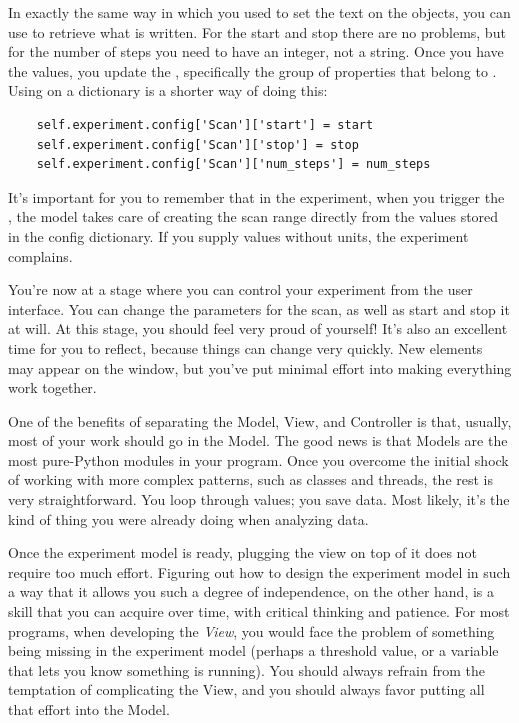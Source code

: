 In exactly the same way in which you used  to set the text on the  objects, you can use  to retrieve what is written. For the start and stop there are no problems, but for the number of steps you need to have an integer, not a string. Once you have the values, you update the , specifically the group of properties that belong to . Using  on a dictionary is a shorter way of doing this:

\begin{verbatim}
    self.experiment.config['Scan']['start'] = start
    self.experiment.config['Scan']['stop'] = stop
    self.experiment.config['Scan']['num_steps'] = num_steps
\end{verbatim}

It's important for you to remember that in the experiment, when you trigger the , the model takes care of creating the scan range directly from the values stored in the config dictionary. If you supply values without units, the experiment complains.



You're now at a stage where you can control your experiment from the user interface. You can change the parameters for the scan, as well as start and stop it at will. At this stage, you should feel very proud of yourself! It's also an excellent time for you to reflect, because things can change very quickly. New elements may appear on the window, but you've put minimal effort into making everything work together.

One of the benefits of separating the Model, View, and Controller is that, usually, most of your work should go in the Model. The good news is that Models are the most pure-Python modules in your program. Once you overcome the initial shock of working with more complex patterns, such as classes and threads, the rest is very straightforward. You loop through values; you save data. Most likely, it's the kind of thing you were already doing when analyzing data.

Once the experiment model is ready, plugging the view on top of it does not require too much effort. Figuring out how to design the experiment model in such a way that it allows you such a degree of independence, on the other hand, is a skill that you can acquire over time, with critical thinking and patience. For most programs, when developing the \emph{View}, you would face the problem of something being missing in the experiment model (perhaps a threshold value, or a variable that lets you know something is running). You should always refrain from the temptation of complicating the View, and you should always favor putting all that effort into the Model.


